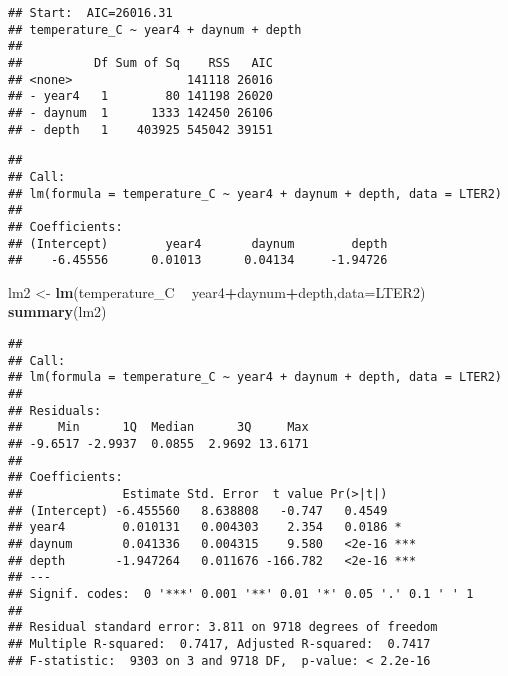 \documentclass[]{article}
\newenvironment{Shaded}{\begin{snugshade}}{\end{snugshade}}
\newcommand{\KeywordTok}[1]{\textcolor[rgb]{0.13,0.29,0.53}{\textbf{#1}}}
\newcommand{\DataTypeTok}[1]{\textcolor[rgb]{0.13,0.29,0.53}{#1}}
\newcommand{\DecValTok}[1]{\textcolor[rgb]{0.00,0.00,0.81}{#1}}
\newcommand{\StringTok}[1]{\textcolor[rgb]{0.31,0.60,0.02}{#1}}
\newcommand{\CommentTok}[1]{\textcolor[rgb]{0.56,0.35,0.01}{\textit{#1}}}
\newcommand{\OperatorTok}[1]{\textcolor[rgb]{0.81,0.36,0.00}{\textbf{#1}}}
\newcommand{\NormalTok}[1]{#1}
\begin{document}
\begin{Shaded}
\end{Shaded}

\begin{verbatim}
## Start:  AIC=26016.31
## temperature_C ~ year4 + daynum + depth
## 
##          Df Sum of Sq    RSS   AIC
## <none>                141118 26016
## - year4   1        80 141198 26020
## - daynum  1      1333 142450 26106
## - depth   1    403925 545042 39151
\end{verbatim}

\begin{verbatim}
## 
## Call:
## lm(formula = temperature_C ~ year4 + daynum + depth, data = LTER2)
## 
## Coefficients:
## (Intercept)        year4       daynum        depth  
##    -6.45556      0.01013      0.04134     -1.94726
\end{verbatim}

\begin{Shaded}
\begin{Highlighting}[]
\NormalTok{lm2 <-}\StringTok{ }\KeywordTok{lm}\NormalTok{(temperature_C }\OperatorTok{~}\StringTok{ }\NormalTok{year4}\OperatorTok{+}\NormalTok{daynum}\OperatorTok{+}\NormalTok{depth,}\DataTypeTok{data=}\NormalTok{LTER2)}
\KeywordTok{summary}\NormalTok{(lm2)}
\end{Highlighting}
\end{Shaded}

\begin{verbatim}
## 
## Call:
## lm(formula = temperature_C ~ year4 + daynum + depth, data = LTER2)
## 
## Residuals:
##     Min      1Q  Median      3Q     Max 
## -9.6517 -2.9937  0.0855  2.9692 13.6171 
## 
## Coefficients:
##              Estimate Std. Error  t value Pr(>|t|)    
## (Intercept) -6.455560   8.638808   -0.747   0.4549    
## year4        0.010131   0.004303    2.354   0.0186 *  
## daynum       0.041336   0.004315    9.580   <2e-16 ***
## depth       -1.947264   0.011676 -166.782   <2e-16 ***
## ---
## Signif. codes:  0 '***' 0.001 '**' 0.01 '*' 0.05 '.' 0.1 ' ' 1
## 
## Residual standard error: 3.811 on 9718 degrees of freedom
## Multiple R-squared:  0.7417, Adjusted R-squared:  0.7417 
## F-statistic:  9303 on 3 and 9718 DF,  p-value: < 2.2e-16
\end{verbatim}
\end{document}
